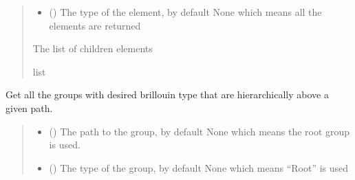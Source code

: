 \documentclass[letterpaper,10pt,english]{sphinxmanual}
\begin{document}
\begin{fulllineitems}
\begin{fulllineitems}
\begin{quote}
\begin{description}
\begin{itemize}
\item {} 
\sphinxAtStartPar
{} (\sphinxstyleliteralemphasis{\sphinxupquote{, }}) \textendash{} The type of the element, by default None which means all the elements are returned

\end{itemize}

\sphinxAtStartPar
The list of children elements

\sphinxAtStartPar
list

\end{description}\end{quote}

\end{fulllineitems}


\begin{fulllineitems}
\label{\detokenize{source/_autosummary/HDF5_BLS.Wrapper:HDF5_BLS.Wrapper.get_special_groups_hierarchy}}
\pysigstartsignatures
\pysiglinewithargsret
{}
{\sphinxparamcomma {}}
{}
\pysigstopsignatures
\sphinxAtStartPar
Get all the groups with desired brillouin type that are hierarchically above a given path.
\begin{quote}\begin{description}
\begin{itemize}
\item {} 
\sphinxAtStartPar
{} (\sphinxstyleliteralemphasis{\sphinxupquote{, }}) \textendash{} The path to the group, by default None which means the root group is used.

\item {} 
\sphinxAtStartPar
{} (\sphinxstyleliteralemphasis{\sphinxupquote{, }}) \textendash{} The type of the group, by default None which means “Root” is used


\end{itemize}
\end{description}
\end{quote}
\end{fulllineitems}
\end{fulllineitems}
\end{document}
